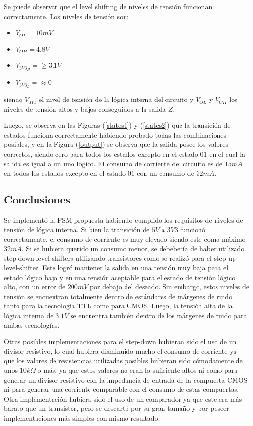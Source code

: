 Se puede observar que el level shifting de niveles de tensión funcionan correctamente. Los niveles de tensión son:
\begin{itemize}
\item $V_{OL} = 10mV$
\item $V_{OH} = 4.8V$
\item $V_{3V3_{H}} = \geq 3.1V$
\item $V_{3V3_{L}} = \approx 0$
\end{itemize}
siendo $V_{3V3}$ el nivel de tensión de la lógica interna del circuito y $V_{OL}$ y $V_{OH}$ los niveles de tensión altos y bajos conseguidos a la salida $Z$.

Luego, se observa en las Figuras (\ref{states1}) y (\ref{states2}) que la transición de estados funciona correctamente habiendo probado todas las combinaciones posibles, y en la Figura (\ref{output}) se observa que la salida posee los valores correctos, siendo cero para todos los estados excepto en el estado $01$ en el cual la salida es igual a un uno lógico. 
El consumo de corriente del circuito es de $15mA$ en todos los estados excepto en el estado $01$ con un consumo de $32mA$.

\subsection{Conclusiones}

Se implementó la FSM propuesta habiendo cumplido los requisitos de niveles de tensión de lógica interna. Si bien la transición de $5V$ a $3V3$ funcionó correctamente, el consumo de corriente es muy elevado siendo este como máximo $32mA$. Si se hubiera querido un consumo menor, se debebería de haber utilizado step-down level-shifters utilizando transistores como se realizó para el step-up level-shifter. Este logró mantener la salida en una tensión muy baja para el estado lógico bajo y en una tensión aceptable para el estado de tensión lógico alto, con un error de $200mV$ por debajo del deseado. Sin embargo, estos niveles de tensión se encuentran totalmente dentro de estándares de márgenes de ruido tanto para la tecnología TTL como para CMOS. Luego, la tensión alta de la lógica interna de $3.1V$ se encuentra también dentro de los márgenes de ruido para ambas tecnologías.


Otras posibles implementaciones para el step-down hubieran sido el uso de un divisor resistivo, lo cual hubiera disminuido mucho el consumo de corriente ya que los valores de resistencias utilizadas posibles hubieran sido cómodamente de unos $10k\Omega$ o más, ya que estos valores no eran lo suficiente altos ni como para generar un divisor resistivo con la impedancia de entrada de la compuerta CMOS ni para generar una corriente comparable con el consumo de estas compuertas. Otra implementación hubiera sido el uso de un comparador ya que este era más barato que un transistor, pero se descartó por su gran tamaño y por poseer implementaciones más simples con mismo resultado.

